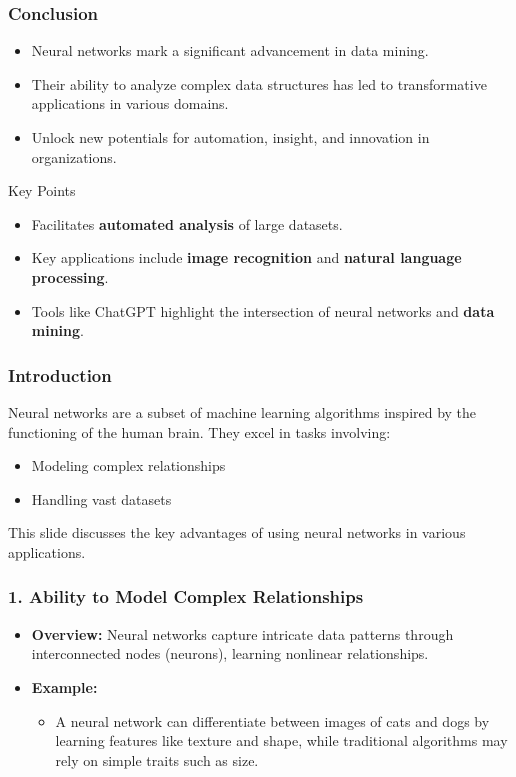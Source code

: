\documentclass[aspectratio=169]{beamer}
\begin{document}
\begin{frame}[fragile]
    \frametitle{Conclusion}
    \begin{itemize}
        \item Neural networks mark a significant advancement in data mining.
        \item Their ability to analyze complex data structures has led to transformative applications in various domains.
        \item Unlock new potentials for automation, insight, and innovation in organizations.
    \end{itemize}
    
    \begin{block}{Key Points}
        \begin{itemize}
            \item Facilitates \textbf{automated analysis} of large datasets.
            \item Key applications include \textbf{image recognition} and \textbf{natural language processing}.
            \item Tools like ChatGPT highlight the intersection of neural networks and \textbf{data mining}.
        \end{itemize}
    \end{block}
\end{frame}

\begin{frame}[fragile]
    \frametitle{Introduction}
    Neural networks are a subset of machine learning algorithms inspired by the functioning of the human brain. They excel in tasks involving:
    \begin{itemize}
        \item Modeling complex relationships
        \item Handling vast datasets
    \end{itemize}
    This slide discusses the key advantages of using neural networks in various applications.
\end{frame}

\begin{frame}[fragile]
    \frametitle{1. Ability to Model Complex Relationships}
    \begin{itemize}
        \item \textbf{Overview:} Neural networks capture intricate data patterns through interconnected nodes (neurons), learning nonlinear relationships.
        \item \textbf{Example:} 
        \begin{itemize}
            \item A neural network can differentiate between images of cats and dogs by learning features like texture and shape, while traditional algorithms may rely on simple traits such as size.
        \end{itemize}
    \end{itemize}
\end{frame}
\end{document}
